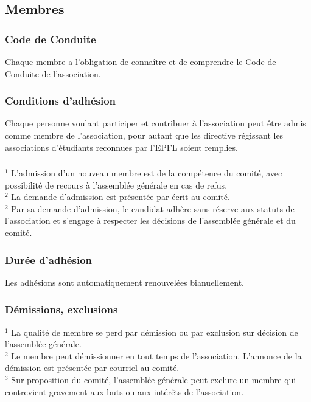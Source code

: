 \documentclass[12pt,a4paper,oneside]{article}
\newcounter{art}
\newcommand{\french}{    \switchcolumn[1]\noindent}
\newcounter{para}
\begin{document}
\begin{paracol}{2}
\french 
	\subsection{Membres}


\french
	\subsubsection{Code de Conduite}
	Chaque membre a l’obligation de connaître et de comprendre le Code de Conduite de l'association.



\french
	\subsubsection{Conditions d’adhésion}
	Chaque personne voulant participer et contribuer à l’association peut être admis comme membre de l’association, pour autant que les directive régissant les associations d'étudiants reconnues par l'EPFL soient remplies.


\french
	\subsubsection{}
	$^1$ L’admission d’un nouveau membre est de la compétence du comité, avec possibilité de recours à l’assemblée générale en cas de refus. \\
	$^2$ La demande d’admission est présentée par écrit au comité. \\
	$^2$ Par sa demande d’admission, le candidat adhère sans réserve aux statuts de l’association et s’engage à respecter les décisions de l’assemblée générale et du comité.

\french
	\subsubsection{Durée d’adhésion}
	Les adhésions sont automatiquement renouvelées bianuellement.


\french
	\subsubsection{Démissions, exclusions}

	$^1$ La qualité de membre se perd par démission ou par exclusion sur décision de l'assemblée générale. \\
	$^2$ Le membre peut démissionner en tout temps de l’association. L’annonce de la démission est présentée par courriel au comité. \\
	$^3$ Sur proposition du comité, l’assemblée générale peut exclure un membre qui contrevient gravement aux buts ou aux intérêts de l’association.


\end{paracol}
\end{document}
